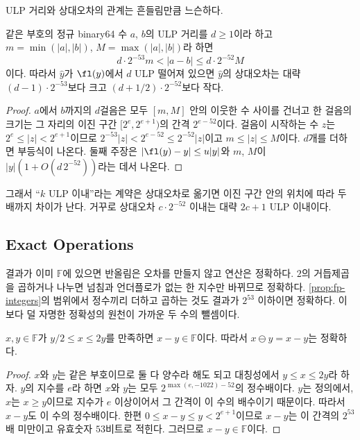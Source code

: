 ULP 거리와 상대오차의 관계는 흔들림만큼 느슨하다.

\begin{proposition}
\label{prop:ulp-relerr}
같은 부호의 정규 binary64 수 $a$, $b$의 ULP 거리를 $d\ge1$이라 하고 $m=\min(|a|,|b|)$, $M=\max(|a|,|b|)$라 하면
\[
d\cdot2^{-53}m<|a-b|\le d\cdot2^{-52}M
\]
이다. 따라서 $\hat y$가 $\fl(y)$에서 $d$ ULP 떨어져 있으면 $\hat y$의 상대오차는 대략 $(d-1)\cdot2^{-53}$보다 크고 $(d+1/2)\cdot2^{-52}$보다 작다.
\end{proposition}

\begin{proof}
$a$에서 $b$까지의 $d$걸음은 모두 $[m,M]$ 안의 이웃한 수 사이를 건너고 한 걸음의 크기는 그 자리의 이진 구간 $[2^e,2^{e+1})$의 간격 $2^{e-52}$이다. 걸음이 시작하는 수 $z$는 $2^e\le|z|<2^{e+1}$이므로 $2^{-53}|z|<2^{e-52}\le2^{-52}|z|$이고 $m\le|z|\le M$이다. $d$개를 더하면 부등식이 나온다. 둘째 주장은 $|\fl(y)-y|\le u|y|$와 $m$, $M$이 $|y|(1+O(d\,2^{-52}))$라는 데서 나온다.
\end{proof}

그래서 ``$k$ ULP 이내''라는 계약은 상대오차로 옮기면 이진 구간 안의 위치에 따라 두 배까지 차이가 난다. 거꾸로 상대오차 $c\cdot2^{-52}$ 이내는 대략 $2c+1$ ULP 이내이다.

\subsection{Exact Operations}

결과가 이미 $\mathbb F$에 있으면 반올림은 오차를 만들지 않고 연산은 정확하다. $2$의 거듭제곱을 곱하거나 나누면 넘침과 언더플로가 없는 한 지수만 바뀌므로 정확하다. \cref{prop:fp-integers}의 범위에서 정수끼리 더하고 곱하는 것도 결과가 $2^{53}$ 이하이면 정확하다. 이보다 덜 자명한 정확성의 원천이 가까운 두 수의 뺄셈이다.

\begin{lemma}[Sterbenz]
\label{lem:sterbenz}
$x,y\in\mathbb F$가 $y/2\le x\le2y$를 만족하면 $x-y\in\mathbb F$이다. 따라서 $x\ominus y=x-y$는 정확하다.
\end{lemma}

\begin{proof}
$x$와 $y$는 같은 부호이므로 둘 다 양수라 해도 되고 대칭성에서 $y\le x\le2y$라 하자. $y$의 지수를 $e$라 하면 $x$와 $y$는 모두 $2^{\max(e,-1022)-52}$의 정수배이다. $y$는 정의에서, $x$는 $x\ge y$이므로 지수가 $e$ 이상이어서 그 간격이 이 수의 배수이기 때문이다. 따라서 $x-y$도 이 수의 정수배이다. 한편 $0\le x-y\le y<2^{e+1}$이므로 $x-y$는 이 간격의 $2^{53}$배 미만이고 유효숫자 $53$비트로 적힌다. 그러므로 $x-y\in\mathbb F$이다.
\end{proof}

